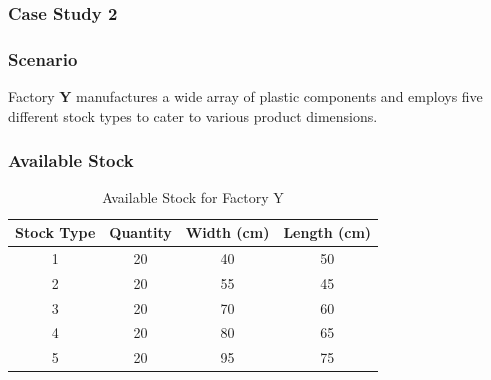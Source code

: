 \documentclass[a4paper]{article}
\begin{document}
\begin{table}[h!]
    \centering
    \caption{Evaluation Using Our Code}
    \end{table}
\FloatBarrier
\subsubsection{Case Study 2}

\subsubsection*{Scenario}
Factory \textbf{Y} manufactures a wide array of plastic components and employs five different stock types to cater to various product dimensions.

\subsubsection*{Available Stock}
\begin{table}[H]
    \centering
    \caption{Available Stock for Factory Y}
    \begin{tabular}{|c|c|c|c|}
        \hline
        \textbf{Stock Type} & \textbf{Quantity} & \textbf{Width (cm)} & \textbf{Length (cm)} \\ \hline
        1 & 20 & 40 & 50 \\ \hline
        2 & 20 & 55 & 45 \\ \hline
        3 & 20 & 70 & 60 \\ \hline
        4 & 20 & 80 & 65 \\ \hline
        5 & 20 & 95 & 75 \\ \hline
    \end{tabular}
\end{table}
\end{document}
